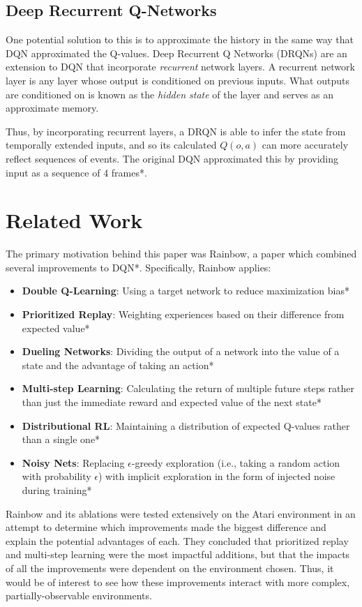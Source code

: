 \documentclass[letterpaper]{article}
\begin{document}
 	\subsection{Deep Recurrent Q-Networks}
 	
 	One potential solution to this is to approximate the history in the same way that DQN approximated the Q-values. Deep Recurrent Q Networks (DRQNs) are an extension to DQN that incorporate \textit{recurrent} network layers. A recurrent network layer is any layer whose output is conditioned on previous inputs. What outputs are conditioned on is known as the \textit{hidden state} of the layer and serves as an approximate memory.
 	
 	Thus, by incorporating recurrent layers, a DRQN is able to infer the state from temporally extended inputs, and so its calculated $Q(o,a)$ can more accurately reflect sequences of events. The original DQN approximated this by providing input as a sequence of 4 frames*.
 	
	 
	
	\section{Related Work}
	
	The primary motivation behind this paper was Rainbow, a paper which combined several improvements to DQN*. Specifically, Rainbow applies:
	\begin{itemize}
		\item \textbf{Double Q-Learning}: Using a target network to reduce maximization bias*
		\item \textbf{Prioritized Replay}: Weighting experiences based on their difference from expected value*
		\item \textbf{Dueling Networks}: Dividing the output of a network into the value of a state and the advantage of taking an action*
		\item \textbf{Multi-step Learning}: Calculating the return of multiple future steps rather than just the immediate reward and expected value of the next state*
		\item \textbf{Distributional RL}: Maintaining a distribution of expected Q-values rather than a single one*
		\item \textbf{Noisy Nets}: Replacing $\epsilon$-greedy exploration (i.e., taking a random action with probability $\epsilon$) with implicit exploration in the form of injected noise during training*
	\end{itemize}
	Rainbow and its ablations were tested extensively on the Atari environment in an attempt to determine which improvements made the biggest difference and explain the potential advantages of each. They concluded that prioritized replay and multi-step learning were the most impactful additions, but that the impacts of all the improvements were dependent on the environment chosen. Thus, it would be of interest to see how these improvements interact with more complex, partially-observable environments. 
	
\end{document}
